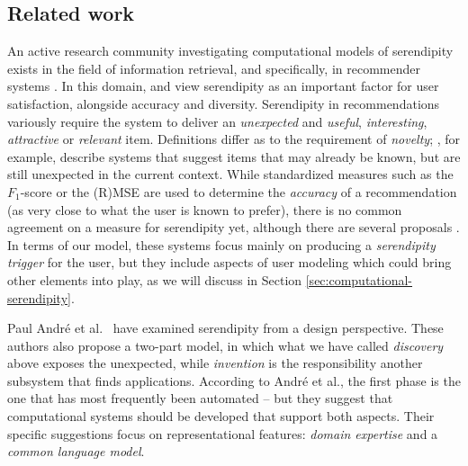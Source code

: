 \subsection{Related work} \label{sec:related}

An active research community investigating computational models of serendipity exists in the field of information retrieval, and specifically, in recommender systems \cite{Toms2000}. In this domain,  and  view serendipity as an important factor for user satisfaction, alongside accuracy and diversity.  Serendipity in recommendations variously require the system to deliver an \emph{unexpected} and \emph{useful}, \emph{interesting}, \emph{attractive} or \emph{relevant} item. 
Definitions differ as to the requirement of \emph{novelty}; , for example, describe systems that suggest items that may already be known, but are still unexpected in the current context.  While standardized measures such as the $F_1$-score or the (R)MSE are used to determine the \emph{accuracy} of a recommendation (as very close to what the user is known to prefer), there is no common agreement on a measure for serendipity yet, although there are several proposals \cite{Murakami2008, Adamopoulos2011, McCay-Peet2011,iaquinta2010can}.
  In terms of our model, these systems focus mainly on producing a \emph{serendipity trigger} for the user, but they include aspects of user modeling which could bring other elements into play, as we will discuss in Section \ref{sec:computational-serendipity}.

Paul Andr{\'e} et al.~\citeyear{andre2009discovery} have examined
serendipity from a design perspective.  These authors also propose a
two-part model, in which what we have called \emph{discovery} above
exposes the unexpected, while \emph{invention} is the responsibility
another subsystem that finds applications.  According to Andr\'e et
al., the first phase is the one that has most frequently been
automated -- but they suggest that computational systems should be
developed that support both aspects.  Their specific suggestions focus
on representational features: \emph{domain expertise} and a
\emph{common language model}.

